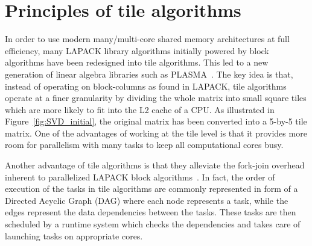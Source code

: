 \section{Principles of tile algorithms}\label{sec:tile}
In order to use modern many/multi-core shared memory architectures at
full efficiency,
many LAPACK library algorithms initially powered by
block algorithms have been redesigned into tile algorithms.
This led to a new generation of linear algebra libraries such as
PLASMA~\cite{DBLP:journals/corr/abs-0709-1272}.
The key idea is that,
instead of operating on block-columns as found in LAPACK,
tile algorithms operate at a finer granularity by dividing the whole
matrix into small square tiles which are more likely to fit into the
L2 cache of a CPU.
As illustrated in Figure~\ref{fig:SVD_initial}, the original
matrix has been converted into a 5-by-5 tile matrix.  One of the
advantages of working at the tile level is that it provides more
room for parallelism with many tasks to keep all computational cores
busy.

Another advantage of tile algorithms is that they alleviate
the fork-join overhead inherent to parallelized LAPACK
block algorithms~\cite{haidar2012analysis}.
In fact,
the order of execution of the tasks in tile algorithms are commonly
represented in form of a Directed Acyclic Graph (DAG) where each node
represents a task, while the edges represent the
data dependencies between the tasks.
These tasks are then scheduled
by a runtime system which checks the dependencies and
takes care of launching tasks on appropriate cores.

